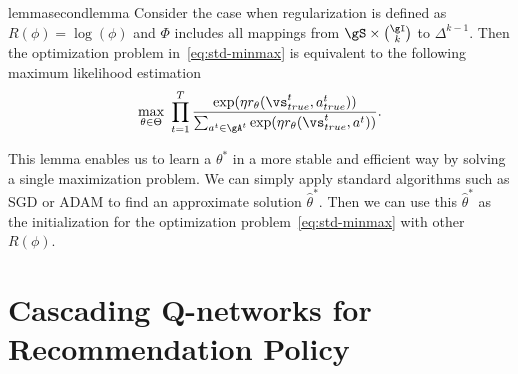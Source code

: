 \documentclass{article} %
\newcommand{\Le}[1]{{\color{red}{\bf\sf [ #1]}}}
\newcommand{\xc}[1]{{\color{blue}{\bf\sf [#1]}}}
\begin{document}
\begin{restatable}{lemma}{secondlemma}\label{lm2:mle}
Consider the case when regularization is defined as $R(\phi) = \log(\phi)$ and $\Phi$ includes all mappings from $\gS \times {\gI \choose k}$ to $\Delta^{k-1}$. Then the optimization problem in~\eqref{eq:std-minmax} is equivalent to the following maximum likelihood estimation
{\small \begin{equation}\label{eq:mle}
	\max_{\theta \in \Theta}~\prod_{t=1}^T \dfrac{\exp(\eta r_{\theta}(\vs_{true}^t, a^t_{true}))}{\sum_{a^t \in \gA^t}\exp(\eta r_{\theta}(\vs_{true}^t, a^t))}.
\end{equation}}
 \end{restatable}
This lemma enables us to learn a $\theta^*$ in a more stable and efficient way by solving a single maximization problem. We can simply apply standard algorithms such as SGD or ADAM to find an approximate solution $\hat{\theta}^*$. Then we can use this $\hat{\theta}^*$ as the initialization for the optimization problem~\eqref{eq:std-minmax} with other $R(\phi)$.

\vspace{-3mm}
\section{Cascading Q-networks for Recommendation Policy}
\vspace{-3mm}
\end{document}
